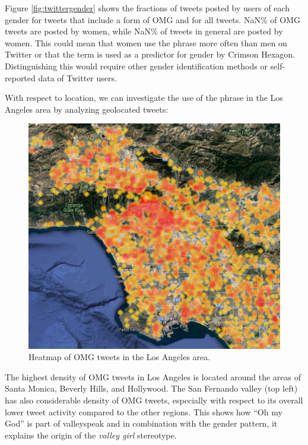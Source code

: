 \documentclass[]{article}
\begin{document}
Figure \ref{fig:twittergender} shows the fractions of tweets posted by users of each gender for tweets that include a form of OMG and for all tweets. NaN\% of OMG tweets are posted by women, while NaN\% of tweets in general are posted by women. This could mean that women use the phrase more often than men on Twitter or that the term is used as a predictor for gender by Crimson Hexagon. Distinguishing this would require other gender identification methods or self-reported data of Twitter users.

With respect to location, we can investigate the use of the phrase in the Los Angeles area by analyzing geolocated tweets:

\begin{figure}

{\centering \includegraphics[width=0.75\linewidth]{LAtweets} 

}

\caption{Heatmap of OMG tweets in the Los Angeles area.}\label{fig:twitterLA}
\end{figure}

The highest density of OMG tweets in Los Angeles is located around the areas of Santa Monica, Beverly Hills, and Hollywood. The San Fernando valley (top left) has also considerable density of OMG tweets, especially with respect to its overall lower tweet activity compared to the other regions. This shows how ``Oh my God'' is part of valleyspeak and in combination with the gender pattern, it explains the origin of the \emph{valley girl} stereotype.
\end{document}
